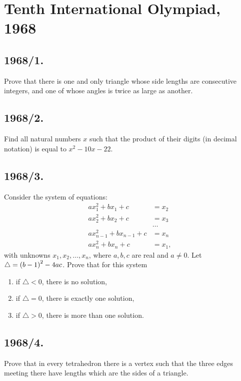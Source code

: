 \documentclass{article}
\begin{document}
  

\section*{Tenth International Olympiad, 1968}

\subsection*{1968/1.}
Prove that there is one and only triangle whose side lengths are consecutive integers, and one of whose angles is twice as large as another.

\subsection*{1968/2.}
Find all natural numbers $x$ such that the product of their digits (in decimal notation) is equal to $x^{2} - 10x - 22$.

\subsection*{1968/3.}
Consider the system of equations:                     
    \begin{align}
        a x_{1}^{2} + b x_{1} + c &= x_{2} \\
        a x_{2}^{2} + b x_{2} + c &= x_{3} \\
        &\hdots \\
        a x_{n-1}^{2} + b x_{n-1} + c &= x_{n} \\
        a x_{n}^{2} + b x_{n} + c &= x_{1},
    \end{align}
		\noindent with unknowns $x_{1},x_{2},\hdots,x_{n}$, where $a,b,c$ are real and $a \not= 0$. Let $\triangle = \left(b - 1\right)^{2} - 4ac$. Prove that for this system
		\begin{enumerate}
			\item if $\triangle < 0$, there is no solution,
			\item if $\triangle = 0$, there is exactly one solution,
			\item if $\triangle > 0$, there is more than one solution.
		\end{enumerate}

\subsection*{1968/4.}
Prove that in every tetrahedron there is a vertex such that the three edges meeting there have lengths which are the sides of a triangle.
\end{document}
